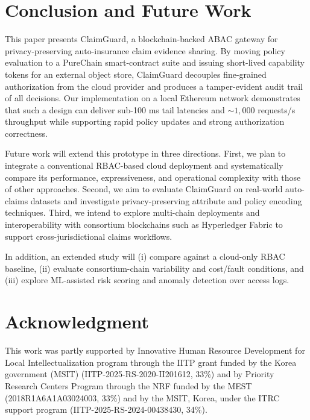 \documentclass[conference]{IEEEtran}
\begin{document}
\section{Conclusion and Future Work}

This paper presents ClaimGuard, a blockchain-backed ABAC gateway for privacy-preserving auto-insurance claim evidence sharing. By moving policy evaluation to a PureChain smart-contract suite and issuing short-lived capability tokens for an external object store, ClaimGuard decouples fine-grained authorization from the cloud provider and produces a tamper-evident audit trail of all decisions. Our implementation on a local Ethereum network demonstrates that such a design can deliver sub-100 ms tail latencies and ${\sim}1{,}000$ requests/s throughput while supporting rapid policy updates and strong authorization correctness.

Future work will extend this prototype in three directions. First, we plan to integrate a conventional RBAC-based cloud deployment and systematically compare its performance, expressiveness, and operational complexity with those of other approaches. Second, we aim to evaluate ClaimGuard on real-world auto-claims datasets and investigate privacy-preserving attribute and policy encoding techniques. Third, we intend to explore multi-chain deployments and interoperability with consortium blockchains such as Hyperledger Fabric to support cross-jurisdictional claims workflows.

In addition, an extended study will (i) compare against a cloud-only RBAC baseline, (ii) evaluate consortium-chain variability and cost/fault conditions, and (iii) explore ML-assisted risk scoring and anomaly detection over access logs.

\section*{Acknowledgment}
This work was partly supported by Innovative Human Resource Development for Local Intellectualization program through the IITP grant funded by the Korea government (MSIT) (IITP-2025-RS-2020-II201612, 33\%) and by Priority Research Centers Program through the NRF funded by the MEST (2018R1A6A1A03024003, 33\%) and by the MSIT, Korea, under the ITRC support program (IITP-2025-RS-2024-00438430, 34\%).

\balance


\end{document}

